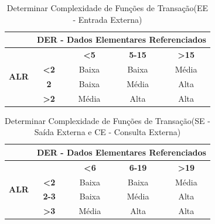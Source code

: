 \begin{table}[H]
\centering
\caption[Determinar Complexidade de Funções de Transação - EE]{Determinar Complexidade de Funções de Transação(EE - Entrada Externa)}
\label{funcoesdetransacao}
\begin{tabular}{|c|c|c|c|c|}
\hline
                              & \multicolumn{4}{c|}{\textbf{DER - Dados Elementares Referenciados}}                    \\ \hline
\multirow{4}{*}{\textbf{ALR}} & \textbf{}              & \textbf{\textless5} & \textbf{5-15} & \textbf{\textgreater15} \\ \cline{2-5}
                              & \textbf{\textless2}    & Baixa               & Baixa         & Média                   \\ \cline{2-5}
                              & \textbf{2}             & Baixa               & Média         & Alta                    \\ \cline{2-5}
                              & \textbf{\textgreater2} & Média               & Alta          & Alta                    \\ \hline
\end{tabular}
\end{table}


\begin{table}[H]
\centering
\caption[Determinar Complexidade de Funções de Transação - SE, CE]{Determinar Complexidade de Funções de Transação(SE - Saída Externa  e CE - Consulta Externa)}
\label{funcoesdetransacao2}
\begin{tabular}{|c|c|c|c|c|}
\hline
                              & \multicolumn{4}{c|}{\textbf{DER - Dados Elementares Referenciados}}                    \\ \hline
\multirow{4}{*}{\textbf{ALR}} & \textbf{}              & \textbf{\textless6} & \textbf{6-19} & \textbf{\textgreater19} \\ \cline{2-5}
                              & \textbf{\textless2}    & Baixa               & Baixa         & Média                   \\ \cline{2-5}
                              & \textbf{2-3}           & Baixa               & Média         & Alta                    \\ \cline{2-5}
                              & \textbf{\textgreater3} & Média               & Alta          & Alta                    \\ \hline
\end{tabular}
\end{table}

